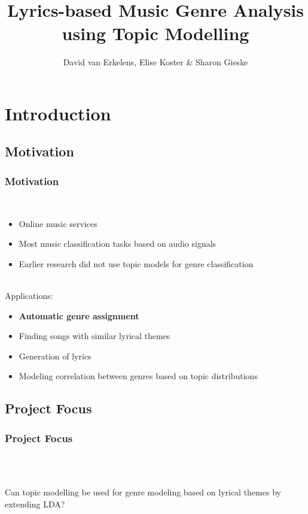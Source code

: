 \documentclass[t,ignorenonframetext]{beamer}
\title{Lyrics-based Music Genre Analysis using Topic Modelling}
\author{David van Erkelens, Elise Koster \& Sharon Gieske}
\begin{document}
\frame{
\maketitle
}
\frame{
\tableofcontents
}

\section[Introduction]{Introduction}

\subsection{Motivation}
\begin{frame}
\frametitle{Motivation}
~\\
\begin{itemize}
	\item Online music services 
	\item Most music classification tasks based on audio signals 
	\item Earlier research did not use topic models for genre classification
\end{itemize}
~\\Applications:
\begin{itemize}
\item \textbf{Automatic genre assignment}
\item Finding songs with similar lyrical themes
\item Generation of lyrics
\item Modeling correlation between genres based on topic distributions
\end{itemize}
\end{frame}

\subsection{Project Focus}
\begin{frame}
\frametitle{Project Focus}
~\\~\\
\begin{center}
\Large{Can topic modelling be used for genre modeling based on lyrical themes by extending LDA?}
\end{center}
~\\~\\
\end{frame}
\end{document}
